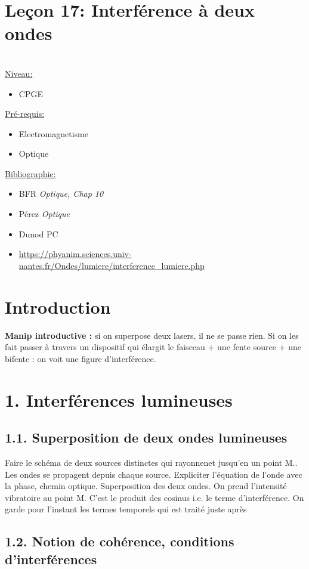 \documentclass[french, a4paper, 10pt, twocolumn, landscape]{article}
\begin{document}
\section*{Leçon 17: Interférence à deux ondes}
\hrulefill\\
	\underline{Niveau:}
	\begin{itemize}
		\item CPGE
	\end{itemize}
	\underline{Pré-requis:} 
	\begin{itemize}
        \item Electromagnetisme
		\item Optique
	\end{itemize}
	\underline{Bibliographie:}
	\begin{itemize}
		\item BFR \textit{Optique, Chap 10}
		\item Pérez \textit{Optique}
		\item Dunod PC
		\item \url{https://phyanim.sciences.univ-nantes.fr/Ondes/lumiere/interference_lumiere.php}
	\end{itemize}
\hrulefill


\section*{Introduction}

\textbf{Manip introductive :} si on superpose deux lasers, il ne se passe rien. Si on les fait passer à travers un dispositif qui élargit le faisceau + une fente source + une bifente : on voit une figure d'interférence.


\section*{1. Interférences lumineuses}
\subsection*{1.1. Superposition de deux ondes lumineuses}

Faire le schéma de deux sources distinctes qui rayonnenet jusqu'en un point M.. Les ondes se propagent depuis chaque source. Expliciter l'équation de l'onde avec la phase, chemin optique. Superposition des deux ondes. On prend l'intensité vibratoire au point M. C'est le produit des cosinus i.e. le terme d'interférence. On garde pour l'instant les termes temporels qui est traité juste après
\subsection*{1.2. Notion de cohérence, conditions d'interférences}
\end{document}
